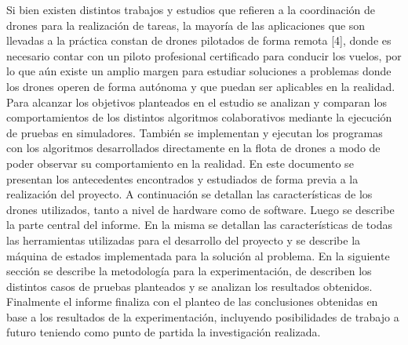 Si bien existen distintos trabajos y estudios que refieren a la coordinación de drones para la realización de tareas, la mayoría de las aplicaciones que son llevadas a la práctica constan de drones pilotados de forma remota [4], donde es necesario contar con un piloto profesional certificado para conducir los vuelos, por lo que aún existe un amplio margen para estudiar soluciones a problemas donde los drones operen de forma autónoma y que puedan ser aplicables en la realidad. Para alcanzar los objetivos planteados en el estudio se analizan y comparan los comportamientos de los distintos algoritmos colaborativos mediante la ejecución de pruebas en simuladores. También se implementan y ejecutan los programas con los algoritmos desarrollados directamente en la flota de drones a modo de poder observar su comportamiento en la realidad.
En este documento se presentan los antecedentes encontrados y estudiados de forma previa a la realización del proyecto. A continuación se detallan las características de los drones utilizados, tanto a nivel de hardware como de software. Luego se describe la parte central del informe. En la misma se detallan las características de todas las herramientas utilizadas para el desarrollo del proyecto y se describe la máquina de estados implementada para la solución al problema. En la siguiente sección se describe la metodología para la experimentación, de describen los distintos casos de pruebas planteados y se analizan los resultados obtenidos. Finalmente el informe finaliza con el planteo de las conclusiones obtenidas en base a los resultados de la experimentación, incluyendo posibilidades de trabajo a futuro teniendo como punto de partida la investigación realizada.
